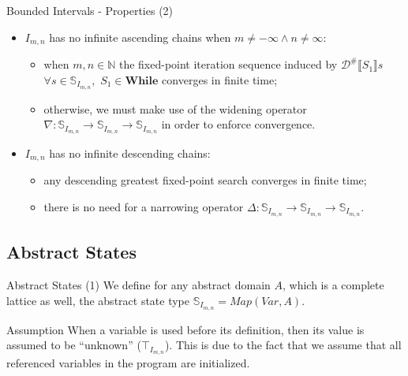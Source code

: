\begin{frame}{Bounded Intervals - Properties (2)}
    \begin{itemize}
        \item $I_{m,n}$ has no infinite ascending chains when $m \neq -\infty \land n \neq \infty$:
        \begin{itemize}
            \item when $m,n\in \mathbb{N}$ the fixed-point iteration sequence induced by $\mathcal{D}^{\#}\llbracket S_1 \rrbracket s$ $\forall s \in \mathbb{S}_{I_{m,n}},\,\,S_1 \in \textbf{While}$ converges in finite time;
            \item otherwise, we must make use of the widening operator $\nabla: \mathbb{S}_{I_{m,n}} \to \mathbb{S}_{I_{m,n}} \to\mathbb{S}_{I_{m,n}}$ in order to enforce convergence. 
        \end{itemize}
        \item $I_{m,n}$ has no infinite descending chains:
        \begin{itemize}
            \item any descending greatest fixed-point search converges in finite time;
            \item there is no need for a narrowing operator $\Delta: \mathbb{S}_{I_{m,n}} \to \mathbb{S}_{I_{m,n}} \to\mathbb{S}_{I_{m,n}}$.
        \end{itemize}
    \end{itemize}
    
\end{frame}

\subsection{Abstract States}

\begin{frame}{Abstract States (1)}
    We define for any abstract domain $A$, which is a complete lattice as well, the abstract state type $\mathbb{S}_{I_{m,n}} = Map(Var, A)$.
    
    \begin{alertblock}{Assumption}
        When a variable is used before its definition, then its value is assumed to be ``unknown'' ($\top_{I_{m,n}}$). This is due to the fact that we assume that all referenced variables in the program are initialized.
    \end{alertblock}
\end{frame}

